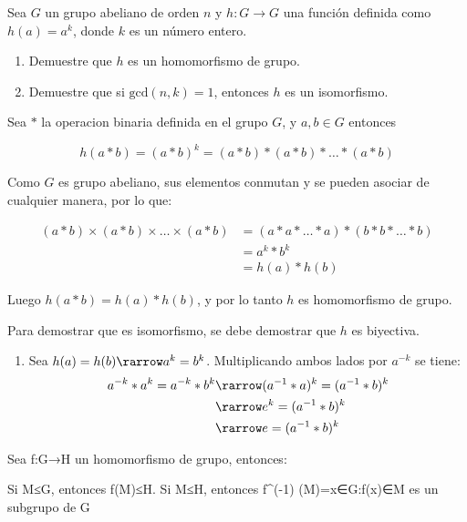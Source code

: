 Sea $G$ un grupo abeliano de orden $n$ y $h:G \rightarrow G$ una función definida como $h(a)=a^k$, donde $k$ es un número entero.
\begin{enumerate}
	\item Demuestre que $h$ es un homomorfismo de grupo.
	\item Demuestre que si $\text{gcd}(n,k) = 1$, entonces $h$ es un isomorfismo.
\end{enumerate}

Sea $*$ la operacion binaria definida en el grupo $G$, y $a,b \in G$ entonces

\begin{equation}
	h(a * b) = (a * b)^k = (a * b) * (a * b) * \ldots * (a * b)
\end{equation}

Como $G$ es grupo abeliano, sus elementos conmutan y se pueden asociar de cualquier manera, por lo que:

\begin{align}
	(a * b)\times (a * b) \times \ldots \times (a * b) &= (a * a * \ldots * a) * (b * b * \ldots * b) \\
		&= a^k * b^k \\
		&= h(a) * h(b)
\end{align}

Luego $h(a * b) = h(a) * h(b)$, y por lo tanto $h$ es homomorfismo de grupo.

Para demostrar que es isomorfismo, se debe demostrar que $h$ es biyectiva. 
\begin{enumerate}
	\item Sea $h(a) = h(b) \rarrow a^k = b^k$. Multiplicando ambos lados por $a^{-k}$ se tiene:
	\begin{align}
		a^{-k} * a^k = a^{-k} * b^k & \rarrow (a^{-1} * a)^k = (a^{-1} * b)^k \\
			& \rarrow e^k = (a^{-1} * b)^k \\
			& \rarrow e = (a^{-1} * b)^k
	\end{align}

	
\end{enumerate}

Sea f:G→H un homomorfismo de grupo, entonces:

	Si M≤G, entonces f(M)≤H.
	Si M≤H, entonces f^(-1) (M)={x∈G:f(x)∈M} es un subgrupo de G
